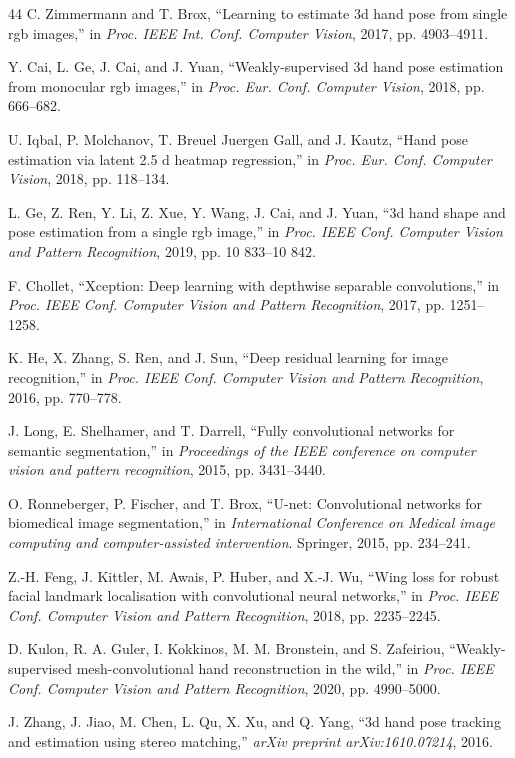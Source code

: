 \documentclass[11pt]{article}
\begin{document}
\begin{thebibliography}{44}
C. Zimmermann and T. Brox, ``Learning to estimate 3d hand pose from single rgb images,'' in \emph{Proc. IEEE Int. Conf. Computer Vision}, 2017, pp. 4903--4911.

Y. Cai, L. Ge, J. Cai, and J. Yuan, ``Weakly-supervised 3d hand pose estimation from monocular rgb images,'' in \emph{Proc. Eur. Conf. Computer Vision}, 2018, pp. 666--682.

U. Iqbal, P. Molchanov, T. Breuel Juergen Gall, and J. Kautz, ``Hand pose estimation via latent 2.5 d heatmap regression,'' in \emph{Proc. Eur. Conf. Computer Vision}, 2018, pp. 118--134.

L. Ge, Z. Ren, Y. Li, Z. Xue, Y. Wang, J. Cai, and J. Yuan, ``3d hand shape and pose estimation from a single rgb image,'' in \emph{Proc. IEEE Conf. Computer Vision and Pattern Recognition}, 2019, pp. 10 833--10 842.

F. Chollet, ``Xception: Deep learning with depthwise separable convolutions,'' in \emph{Proc. IEEE Conf. Computer Vision and Pattern Recognition}, 2017, pp. 1251--1258.

K. He, X. Zhang, S. Ren, and J. Sun, ``Deep residual learning for image recognition,'' in \emph{Proc. IEEE Conf. Computer Vision and Pattern Recognition}, 2016, pp. 770--778.

J. Long, E. Shelhamer, and T. Darrell, ``Fully convolutional networks for semantic segmentation,'' in \emph{Proceedings of the IEEE conference on computer vision and pattern recognition}, 2015, pp. 3431--3440.

O. Ronneberger, P. Fischer, and T. Brox, ``U-net: Convolutional networks for biomedical image segmentation,'' in \emph{International Conference on Medical image computing and computer-assisted intervention}. Springer, 2015, pp. 234--241.

Z.-H. Feng, J. Kittler, M. Awais, P. Huber, and X.-J. Wu, ``Wing loss for robust facial landmark localisation with convolutional neural networks,'' in \emph{Proc. IEEE Conf. Computer Vision and Pattern Recognition}, 2018, pp. 2235--2245.

D. Kulon, R. A. Guler, I. Kokkinos, M. M. Bronstein, and S. Zafeiriou, ``Weakly-supervised mesh-convolutional hand reconstruction in the wild,'' in \emph{Proc. IEEE Conf. Computer Vision and Pattern Recognition}, 2020, pp. 4990--5000.

J. Zhang, J. Jiao, M. Chen, L. Qu, X. Xu, and Q. Yang, ``3d hand pose tracking and estimation using stereo matching,'' \emph{arXiv preprint arXiv:1610.07214}, 2016.


\end{thebibliography}
\end{document}
